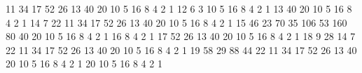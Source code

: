 \nextt
\begin{console}[frame=single, commandchars=\\\{\}]
11 34 17 52 26 13 40 20 10 5 16 8 4 2 1
12 6 3 10 5 16 8 4 2 1
13 40 20 10 5 16 8 4 2 1
14 7 22 11 34 17 52 26 13 40 20 10 5 16 8 4 2 1
15 46 23 70 35 106 53 160 80 40 20 10 5 16 8 4 2 1
16 8 4 2 1
17 52 26 13 40 20 10 5 16 8 4 2 1
18 9 28 14 7 22 11 34 17 52 26 13 40 20 10 5 16 8 4 2 1
19 58 29 88 44 22 11 34 17 52 26 13 40 20 10 5 16 8 4 2 1
20 10 5 16 8 4 2 1
\end{console}
